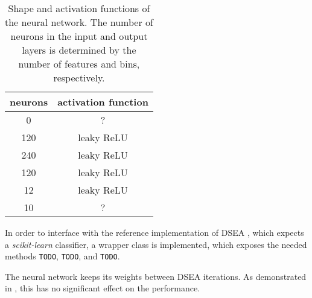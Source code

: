 \begin{table}
  \centering
  \caption{
    Shape and activation functions of the neural network.
    The number of neurons in the input and output layers is determined by the number of features and bins, respectively.
  }
  \label{tab:nn_shape}
  \begin{tabular}{S[table-format=4.0] c}
    \toprule
    {neurons} & {activation function} \\
       & ? \\ %
    120 & leaky ReLU \\
    240 & leaky ReLU \\
    120 & leaky ReLU \\
    12  & leaky ReLU \\
    10  & ? \\
    \bottomrule
  \end{tabular}
\end{table}


In order to interface with the reference implementation of DSEA \cite{dsea_python},
  which expects a \emph{scikit-learn} \cite{sklearn} classifier,
a wrapper class is implemented,
  which exposes the needed methods
  \texttt{TODO}, \texttt{TODO}, and \texttt{TODO}.

The neural network keeps its weights between DSEA iterations.
As demonstrated in \cite{dsea_samuel}, %
this has no significant effect on the performance.
